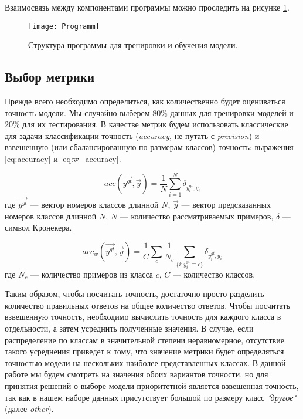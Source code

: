  \indent
 \indent
 Взаимосвязь между компонентами программы можно проследить на 
  рисунке \ref{tikzpicture: programm}.

\begin{figure}[h!]
    \begin{center}
   	    \texttt{[image: Programm]}
   	\end{center}
   	\caption{Структура программы для тренировки и обучения модели.}
   	\label{tikzpicture: programm}
\end{figure}


\subsection{Выбор метрики}

\indent
\indent
Прежде всего необходимо определиться, как количественно будет оцениваться
точность модели. Мы случайно выберем 80\% данных 
для тренировки моделей и 
20\% для их тестирования. В качестве метрик будем использовать 
классические для задачи классификации точность
 (\textit{accuracy}, не путать с \textit{precision}) и взвешенную (или
 сбалансированную по размерам классов) точность:
выражения \ref{eq:accuracy} и \ref{eq:w_accuracy}.


\begin{equation}\label{eq:accuracy}
	   acc(\vec{y^{gt}}, \vec{y}) = \frac{1}{N}\sum_{i=1}^{N} \delta_{y_i^{gt}, y_i}
\end{equation}
где $\vec{y^{gt}}$ --- вектор номеров классов длинной $N$, 
$\vec{y}$ --- вектор предсказанных номеров классов длинной $N$,
$N$ --- количество рассматриваемых примеров,
$\delta$ --- символ Кронекера.

\begin{equation}\label{eq:w_accuracy}
	   acc_w(\vec{y^{gt}}, \vec{y}) = 
	   \frac{1}{C} \sum_{c}
	   \frac{1}{N_c}\sum_{\{i: y_i^{gt}\equiv c\}} \delta_{y_i^{gt}, y_i}
\end{equation}
где $N_c$ --- количество примеров из класса $c$, $C$ --- количество классов.
 

\indent
\indent
Таким образом, чтобы посчитать точность, достаточно просто разделить
количество правильных ответов на общее количество ответов. Чтобы посчитать
взвешенную точность, необходимо вычислить точность для каждого класса
в отдельности, а затем усреднить полученные значения. В случае, если распределение
по классам в значительной степени неравномерное, отсутствие такого усреднения
приведет к тому, что значение метрики будет определяться точностью модели на
нескольких наиболее представленных классах. В данной работе мы будем
смотреть на значения обоих вариантов точности, но для принятия
решений о выборе модели приоритетной является взвешенная точность, так как в нашем наборе данных присутствует большой по размеру класс \textit{"другое"} (далее \textit{other}).


